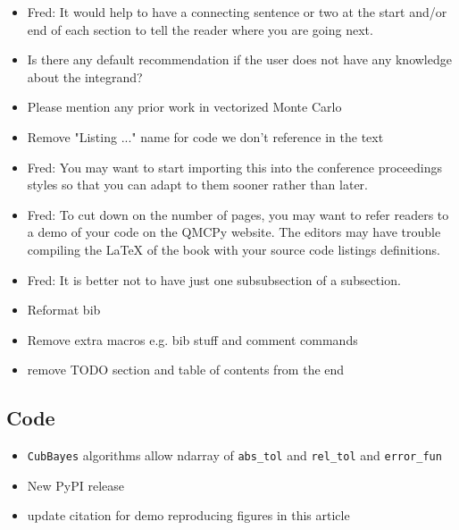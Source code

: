 \documentclass[graybox]{svmult}
\newcommand{\AGSComment}[1]{{\color{brown} #1}}
\newcommand{\JRComment}[1]{{\color{violet}#1}}
\newcommand{\FJHComment}[1]{{\color{purple}Fred:  #1}}
\begin{document}
\begin{itemize}
    \item \FJHComment{It would help to have a connecting sentence or two at the start and/or end of each section to tell the reader where you are going next.}
    \item \JRComment{Is there any default recommendation if the user does not have any knowledge about the integrand?}
    \item \JRComment{Please mention any prior work in vectorized Monte Carlo}
    \item \AGSComment{Remove "Listing ..." name for code we don't reference in the text}
    \item \FJHComment{You may want to start importing this into the conference proceedings styles so that you can adapt to them sooner rather than later.}
    \item \FJHComment{To cut down on the number of pages, you may want to refer readers to a demo of your code on the QMCPy website.  The editors may have trouble compiling the LaTeX of the book with your source code listings definitions.}
    \item \FJHComment{It is better not to have just one subsubsection of a subsection.}
    \item \AGSComment{Reformat bib}
    \item \AGSComment{Remove extra macros e.g. bib stuff and comment commands}
    \item \AGSComment{remove TODO section and table of contents from the end}
\end{itemize}

\subsection*{Code}

\begin{itemize}
    \item \AGSComment{\texttt{CubBayes} algorithms allow ndarray of \texttt{abs\_tol} and \texttt{rel\_tol} and \texttt{error\_fun}}
    \item \AGSComment{New PyPI release}
    \item \AGSComment{update citation for demo reproducing figures in this article}
\end{itemize}

\tableofcontents
\end{document}
